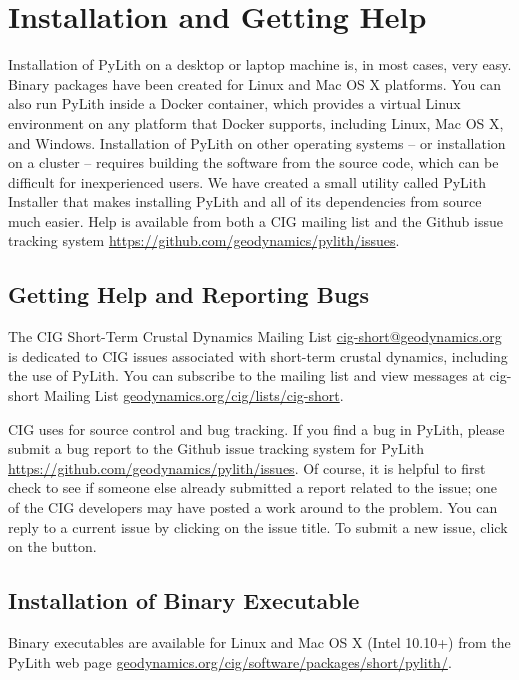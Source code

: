 \chapter{Installation and Getting Help}
\label{cha:installation}

Installation of PyLith on a desktop or laptop machine is, in most
cases, very easy. Binary packages have been created for Linux and Mac
OS X platforms. You can also run PyLith inside a Docker container,
which provides a virtual Linux environment on any platform that Docker
supports, including Linux, Mac OS X, and Windows. Installation of
PyLith on other operating systems -- or installation on a cluster --
requires building the software from the source code, which can be
difficult for inexperienced users. We have created a small utility
called PyLith Installer that makes installing PyLith and all of its
dependencies from source much easier. Help is available from both a
CIG mailing list and the Github issue tracking system
\url{https://github.com/geodynamics/pylith/issues}.


\section{Getting Help and Reporting Bugs}
\label{sec:help}

The CIG Short-Term Crustal Dynamics Mailing List
\url{cig-short@geodynamics.org} is dedicated to CIG issues associated
with short-term crustal dynamics, including the use of PyLith. You can
subscribe to the mailing list and view messages at cig-short Mailing
List \url{geodynamics.org/cig/lists/cig-short}.

CIG uses  for source control and bug tracking. If you
find a bug in PyLith, please submit a bug report to the Github issue
tracking system for PyLith \url{https://github.com/geodynamics/pylith/issues}.
Of course, it is helpful to first check to see if someone else already
submitted a report related to the issue; one of the CIG developers
may have posted a work around to the problem. You can reply to a current
issue by clicking on the issue title. To submit a new issue, click
on the  button.


\section{Installation of Binary Executable}

Binary executables are available for Linux and Mac OS X (Intel 10.10+)
from the PyLith web page
\url{geodynamics.org/cig/software/packages/short/pylith/}.


